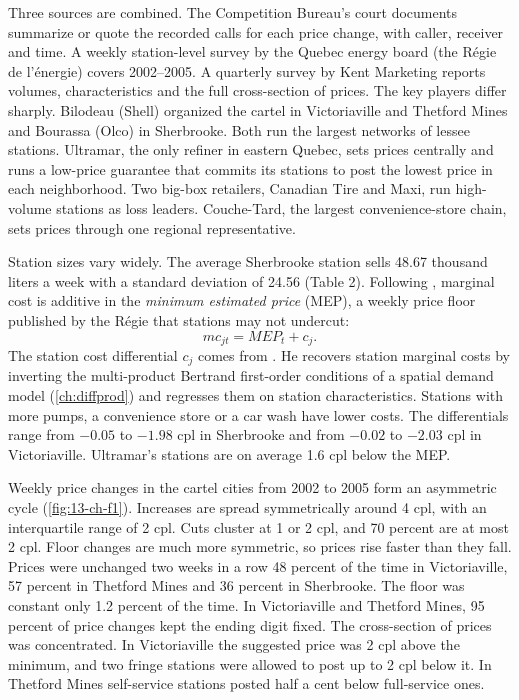 Three sources are combined. The Competition Bureau's court documents summarize or quote the recorded calls for each price
change, with caller, receiver and time. A weekly station-level survey by the Quebec energy board (the R\'egie de
l'\'energie) covers 2002--2005. A quarterly survey by Kent Marketing reports volumes, characteristics and the full
cross-section of prices. The key players differ sharply. Bilodeau (Shell) organized the cartel in Victoriaville and
Thetford Mines and Bourassa (Olco) in Sherbrooke. Both run the largest networks of lessee stations. Ultramar, the only
refiner in eastern Quebec, sets prices centrally and runs a low-price guarantee that commits its stations to post the
lowest price in each neighborhood. Two big-box retailers, Canadian Tire and Maxi, run high-volume stations as loss leaders.
Couche-Tard, the largest convenience-store chain, sets prices through one regional representative.

Station sizes vary widely. The average Sherbrooke station sells 48.67 thousand liters a week with a standard deviation
of 24.56 (Table 2). Following \citet{Houde2012}, marginal cost is additive in the \emph{minimum estimated price} (MEP), a
weekly price floor published by the R\'egie that stations may not undercut:
\begin{equation}\label{eq:13-ch-mc}
mc_{jt}=\textit{MEP}_t+c_j .
\end{equation}
The station cost differential $c_j$ comes from \citet{Houde2012}. He recovers station marginal costs by inverting the
multi-product Bertrand first-order conditions of a spatial demand model (\cref{ch:diffprod}) and regresses them on station
characteristics. Stations with more pumps, a convenience store or a car wash have lower costs. The differentials range
from $-0.05$ to $-1.98$ cpl in Sherbrooke and from $-0.02$ to $-2.03$ cpl in Victoriaville. Ultramar's stations are on
average 1.6 cpl below the MEP.

Weekly price changes in the cartel cities from 2002 to 2005 form an asymmetric cycle (\cref{fig:13-ch-f1}). Increases are
spread symmetrically around 4 cpl, with an interquartile range of 2 cpl. Cuts cluster at 1 or 2 cpl, and 70 percent are at
most 2 cpl. Floor changes are much more symmetric, so prices rise faster than they fall. Prices were unchanged two weeks in a
row 48 percent of the time in Victoriaville, 57 percent in Thetford Mines and 36 percent in Sherbrooke. The floor was
constant only 1.2 percent of the time. In Victoriaville and Thetford Mines, 95 percent of price changes kept the ending digit
fixed. The cross-section of prices was
concentrated. In Victoriaville the suggested price was 2 cpl above the minimum, and two fringe stations were allowed to post
up to 2 cpl below it. In Thetford Mines self-service stations posted half a cent below full-service ones.

